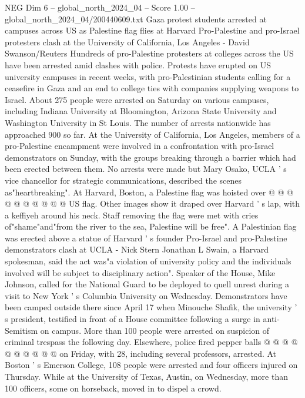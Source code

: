 \begin{textsample}{NEG Dim 6 – global\_north\_2024\_04 – Score 1.00 – global\_north\_2024\_04/200440609.txt}  \label{ex:f6_neg_371}
Gaza protest students arrested at campuses across US as Palestine flag flies at Harvard Pro-Palestine and pro-Israel protesters clash at the University of California, Los Angeles - David Swanson/Reuters Hundreds of pro-Palestine protesters at colleges across the US have been arrested amid clashes with police.
Protests have erupted on US university campuses in recent weeks, with pro-Palestinian students calling for a ceasefire in Gaza and an end to college ties with companies supplying weapons to Israel.
About 275 people were arrested on Saturday on various campuses, including Indiana University at Bloomington, Arizona State University and Washington University in St Louis.
The number of arrests nationwide has approached 900 so far.
At the University of California, Los Angeles, members of a pro-Palestine encampment were involved in a confrontation with pro-Israel demonstrators on Sunday, with the groups breaking through a barrier which had been erected between them.
No arrests were made but Mary Osako, UCLA ' s vice chancellor for strategic communications, described the scenes as"heartbreaking".
At Harvard, Boston, a Palestine flag was hoisted over @ @ @ @ @ @ @ @ @ @ US flag.
Other images show it draped over Harvard ' s lap, with a keffiyeh around his neck.
Staff removing the flag were met with cries of"shame"and"from the river to the sea, Palestine will be free".
A Palestinian flag was erected above a statue of Harvard ' s founder Pro-Israel and pro-Palestine demonstrators clash at UCLA - Nick Stern Jonathan L Swain, a Harvard spokesman, said the act was"a violation of university policy and the individuals involved will be subject to disciplinary action".
Speaker of the House, Mike Johnson, called for the National Guard to be deployed to quell unrest during a visit to New York ' s Columbia University on Wednesday.
Demonstrators have been camped outside there since April 17 when Minouche Shafik, the university ' s president, testified in front of a House committee following a surge in anti-Semitism on campus.
More than 100 people were arrested on suspicion of criminal trespass the following day.
Elsewhere, police fired pepper balls @ @ @ @ @ @ @ @ @ @ on Friday, with 28, including several professors, arrested.
At Boston ' s Emerson College, 108 people were arrested and four officers injured on Thursday.
While at the University of Texas, Austin, on Wednesday, more than 100 officers, some on horseback, moved in to dispel a crowd.

\end{textsample}
